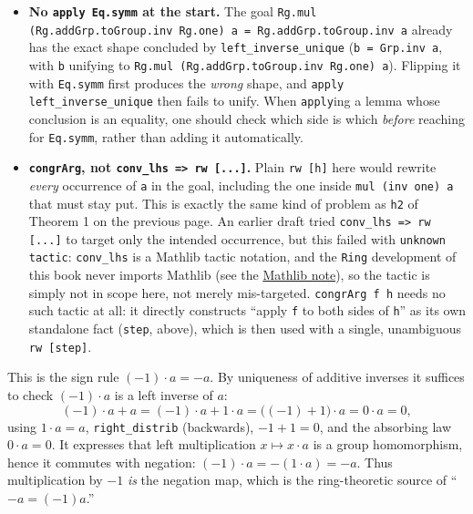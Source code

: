 \begin{itemize}
\tightlist
\item
  \textbf{No \texttt{apply Eq.symm} at the start.} The goal \texttt{Rg.mul (Rg.addGrp.toGroup.inv Rg.one) a = Rg.addGrp.toGroup.inv a} already has the exact shape concluded by \texttt{left\_\allowbreak{}inverse\_\allowbreak{}unique} (\texttt{b = Grp.inv a}, with \texttt{b} unifying to \texttt{Rg.mul (Rg.addGrp.toGroup.inv Rg.one) a}). Flipping it with \texttt{Eq.symm} first produces the \emph{wrong} shape, and \texttt{apply left\_\allowbreak{}inverse\_\allowbreak{}unique} then fails to unify. When \texttt{apply}ing a lemma whose conclusion is an equality, one should check which side is which \emph{before} reaching for \texttt{Eq.symm}, rather than adding it automatically.
\item
  \textbf{\texttt{congrArg}, not \texttt{conv\_\allowbreak{}lhs => rw [...]}.} Plain \texttt{rw [h]} here would rewrite \emph{every} occurrence of \texttt{a} in the goal, including the one inside \texttt{mul (inv one) a} that must stay put. This is exactly the same kind of problem as \texttt{h2} of Theorem 1 on the previous page. An earlier draft tried \texttt{conv\_\allowbreak{}lhs => rw [...]} to target only the intended occurrence, but this failed with \texttt{unknown tactic}: \texttt{conv\_\allowbreak{}lhs} is a Mathlib tactic notation, and the \texttt{Ring} development of this book never imports Mathlib (see the \hyperref[sec:00-setup:04-mathlib-note:1]{Mathlib note}), so the tactic is simply not in scope here, not merely mis-targeted. \texttt{congrArg f h} needs no such tactic at all: it directly constructs ``apply \texttt{f} to both sides of \texttt{h}'' as its own standalone fact (\texttt{step}, above), which is then used with a single, unambiguous \texttt{rw [step]}.
\end{itemize}

\begin{mathreading}

This is the sign rule \((-1)\cdot a = -a\). By uniqueness of additive inverses it suffices to check \((-1)\cdot a\) is a left inverse of \(a\): \[
(-1)\cdot a + a = (-1)\cdot a + 1\cdot a = \big((-1) + 1\big)\cdot a
= 0\cdot a = 0,
\] using \(1\cdot a = a\), \texttt{right\_\allowbreak{}distrib} (backwards), \(-1 + 1 = 0\), and the absorbing law \(0\cdot a = 0\). It expresses that left multiplication \(x \mapsto x\cdot a\) is a group homomorphism, hence it commutes with negation: \((-1)\cdot a = -(1\cdot a) = -a\). Thus multiplication by \(-1\) \emph{is} the negation map, which is the ring-theoretic source of ``\(-a = (-1)a\).''

\end{mathreading}

